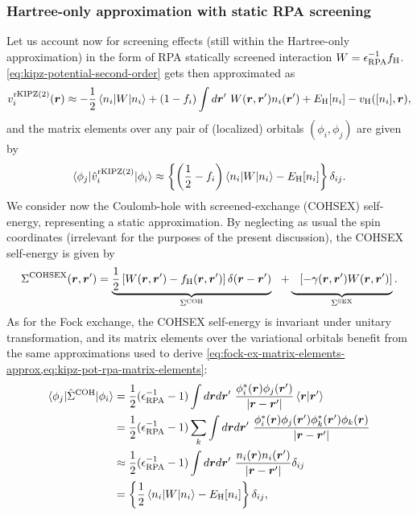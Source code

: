 \subsubsection*{Hartree-only approximation with static RPA screening}
Let us account now for screening effects (still within the Hartree-only approximation) in the form of RPA statically screened interaction $W = \epsilon^{-1}_{\rm RPA} f_{\rm H}$. \cref{eq:kipz-potential-second-order} gets then approximated as
%
\begin{equation}
    v^{\rm rKIPZ(2)}_i({\bm r}) \approx - \frac{1}{2} \braket{n_i|W|n_i} + (1-f_i) \int d{\bm r}' \ W({\bm r},{\bm r}') n_i({\bm r}') + E_{\rm H}[n_i] - v_{\rm H}([n_i],{\bm r}) ,
    \label{eq:kipz-pot-second-order-rpa}
\end{equation}
%
and the matrix elements over any pair of (localized) orbitals $(\phi_i,\phi_j)$ are given by
%
\begin{equation}
    \braket{\phi_j|\hat{v}^{\rm rKIPZ(2)}_i|\phi_i} \approx \left\{ \left( \frac{1}{2} - f_i \right) \braket{n_i|W|n_i} - E_{\rm H}[n_i] \right\} \delta_{ij} .
    \label{eq:kipz-pot-rpa-matrix-elements}
\end{equation}
%
We consider now the Coulomb-hole with screened-exchange (COHSEX) self-energy, representing a static \gw approximation. By neglecting as usual the spin coordinates (irrelevant for the purposes of the present discussion), the COHSEX self-energy is given by
%
\begin{equation}
    \Sigma^{\rm COHSEX}(\br,\br') = \underbrace{\frac{1}{2} \left[ W(\br,\br') - f_{\rm H}(\br,\br') \right] \delta(\br-\br')}_{\Sigma^{\rm COH}} \ \ + \underbrace{\bfrac{\ }{\ } \left[ - \gamma(\br,\br') W(\br,\br') \right]}_{\Sigma^{\rm SEX}} .
    \label{eq:cohsex-self-energy}
\end{equation}
%
As for the Fock exchange, the COHSEX self-energy is invariant under unitary transformation, and its matrix elements over the variational orbitals benefit from the same approximations used to derive \cref{eq:fock-ex-matrix-elements-approx,eq:kipz-pot-rpa-matrix-elements}:
%
\begin{equation}
    \begin{split}
        \braket{\phi_j|\hat{\Sigma}^{\rm COH}|\phi_i} &= \frac{1}{2}(\epsilon^{-1}_{\rm RPA} - 1) \int d\br d\br' \ \frac{\phi_i^*(\br) \phi_j(\br')}{|\br-\br'|} \braket{\br|\br'} \\
        &= \frac{1}{2}(\epsilon^{-1}_{\rm RPA} - 1) \sum_k \int d\br d\br' \ \frac{\phi_i^*(\br) \phi_j(\br') \phi_k^*(\br') \phi_k(\br)}{|\br-\br'|} \\
        &\approx \frac{1}{2}(\epsilon^{-1}_{\rm RPA} - 1) \int d\br d\br' \ \frac{n_i(\br) n_i(\br')}{|\br-\br'|} \delta_{ij} \\
        &= \left\{ \frac{1}{2} \braket{n_i|W|n_i} - E_{\rm H}[n_i] \right\} \delta_{ij},
    \end{split}
    \label{eq:matrix-elements-coh-self-energy}
\end{equation}
